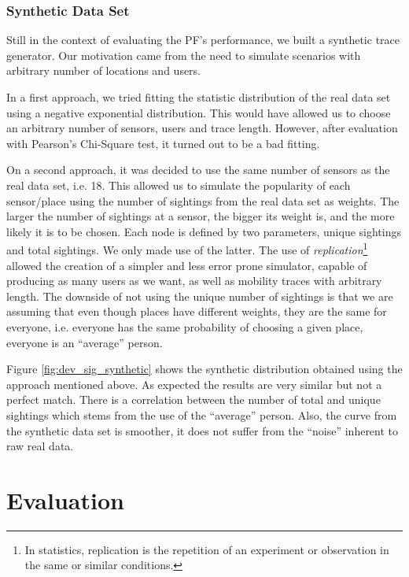 \subsubsection{Synthetic Data Set}
\label{sec:simulator}

Still in the context of evaluating the PF's performance, we built a
synthetic trace generator. Our motivation came from the need to
simulate scenarios with arbitrary number of locations and users.

In a first approach, we tried fitting the statistic distribution of
the real data set using a negative exponential distribution. This
would have allowed us to choose an arbitrary number of sensors, users
and trace length. However, after evaluation with Pearson's Chi-Square
test, it turned out to be a bad fitting. 

On a second approach, it was decided to use the same number of sensors
as the real data set, i.e. 18. This allowed us to simulate the
popularity of each sensor/place using the number of sightings from the
real data set as weights. The larger the number of sightings at a
sensor, the bigger its weight is, and the more likely it is to be
chosen. Each node is defined by two parameters, unique sightings and
total sightings. We only made use of the latter. The use of
\emph{replication}\footnote{In statistics, replication is the
  repetition of an experiment or observation in the same or similar
  conditions.} allowed the creation of a simpler and less error prone
simulator, capable of producing as many users as we want, as well as
mobility traces with arbitrary length.  The downside of not using the
unique number of sightings is that we are assuming that even though
places have different weights, they are the same for everyone,
i.e. everyone has the same probability of choosing a given place,
everyone is an ``average'' person.

Figure \ref{fig:dev_sig_synthetic} shows the synthetic distribution
obtained using the approach mentioned above.  As expected the results
are very similar but not a perfect match. There is a
correlation between the number of total and unique sightings which
stems from the use of the ``average'' person. Also, the curve from the
synthetic data set is smoother, it does not suffer from the
``noise'' inherent to raw real data.

\section{Evaluation}
\label{sec:ct-evaluation}

